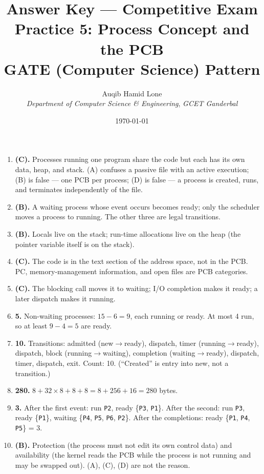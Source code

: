 \documentclass[11pt]{article}
\title{Answer Key --- Competitive Exam Practice 5: Process Concept and the PCB\\\large GATE (Computer Science) Pattern}
\author{Auqib Hamid Lone\\[0.3em]
  \emph{Department of Computer Science \& Engineering}, \emph{GCET Ganderbal}}
\date{\today}
\begin{document}
\maketitle

\begin{enumerate}
\item[\textbf{Q1}] \textbf{(C).} Processes running one program share the code but each has its own data, heap, and stack. (A) confuses a passive file with an active execution; (B) is false --- one PCB per process; (D) is false --- a process is created, runs, and terminates independently of the file.

\item[\textbf{Q2}] \textbf{(B).} A waiting process whose event occurs becomes ready; only the scheduler moves a process to running. The other three are legal transitions.

\item[\textbf{Q3}] \textbf{(B).} Locals live on the stack; run-time allocations live on the heap (the pointer variable itself is on the stack).

\item[\textbf{Q4}] \textbf{(C).} The code is in the text section of the address space, not in the PCB. PC, memory-management information, and open files are PCB categories.

\item[\textbf{Q5}] \textbf{(C).} The blocking call moves it to waiting; I/O completion makes it ready; a later dispatch makes it running.

\item[\textbf{Q6}] \textbf{5.} Non-waiting processes: $15-6=9$, each running or ready. At most 4 run, so at least $9-4=5$ are ready.

\item[\textbf{Q7}] \textbf{10.} Transitions: admitted (new$\to$ready), dispatch, timer (running$\to$ready), dispatch, block (running$\to$waiting), completion (waiting$\to$ready), dispatch, timer, dispatch, exit. Count: 10. (``Created'' is entry into new, not a transition.)

\item[\textbf{Q8}] \textbf{280.} $8 + 32\times 8 + 8 + 8 = 8+256+16 = 280$ bytes.

\item[\textbf{Q9}] \textbf{3.} After the first event: run \texttt{P2}, ready \{\texttt{P3}, \texttt{P1}\}. After the second: run \texttt{P3}, ready \{\texttt{P1}\}, waiting \{\texttt{P4}, \texttt{P5}, \texttt{P6}, \texttt{P2}\}. After the completions: ready \{\texttt{P1}, \texttt{P4}, \texttt{P5}\} = 3.

\item[\textbf{Q10}] \textbf{(B).} Protection (the process must not edit its own control data) and availability (the kernel reads the PCB while the process is not running and may be swapped out). (A), (C), (D) are not the reason.
\end{enumerate}
\end{document}
